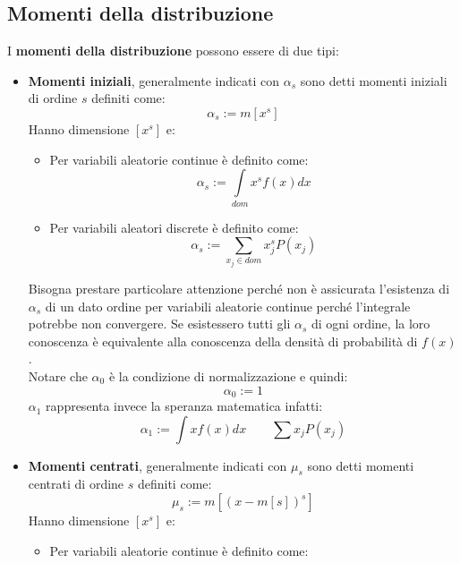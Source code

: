 \documentclass[11pt,a4paper]{book}
\begin{document}
\subsection{Momenti della distribuzione}
I \textbf{momenti della distribuzione} possono essere di due tipi:
\begin{itemize}
\item \textbf{Momenti iniziali}, generalmente indicati con $ \alpha_s $ sono detti momenti iniziali di ordine $ s $ definiti come: 
\begin{equation}
\alpha_s := m[x^s]
\end{equation}
Hanno dimensione $ [x^s] $ e:
\begin{itemize}
\item Per variabili aleatorie continue è definito come:
\begin{equation}
\alpha_s := \int\limits_{\textit{dom}}x^s f(x) dx
\end{equation}
\item Per variabili aleatori discrete è definito come:
\begin{equation}
\alpha_s := \sum\limits_{x_j \in \textit{dom}}x_j^s P(x_j)
\end{equation}
\end{itemize}
Bisogna prestare particolare attenzione perché non è assicurata l'esistenza di $ \alpha_s $ di un dato ordine per variabili aleatorie continue perché l'integrale potrebbe non convergere. Se esistessero tutti gli $ \alpha_s $ di ogni ordine, la loro conoscenza è equivalente alla conoscenza della densità di probabilità di $ f(x) $. \\Notare che $ \alpha_0 $ è la condizione di normalizzazione e quindi:
\begin{equation}
\alpha_0 := 1 
\end{equation}
$ \alpha_1 $ rappresenta invece la speranza matematica infatti:
\begin{equation}
\alpha_1 := \int xf(x)dx \qquad \sum x_jP(x_j)
\end{equation}
\item \textbf{Momenti centrati}, generalmente indicati con $ \mu_s $ sono detti momenti centrati di ordine $ s $ definiti come: 
\begin{equation}
\mu_s := m[(x-m[s])^s]
\end{equation}
Hanno dimensione $ [x^s] $ e:
\begin{itemize}
\item Per variabili aleatorie continue è definito come:

\end{itemize}
\end{itemize}
\end{document}
